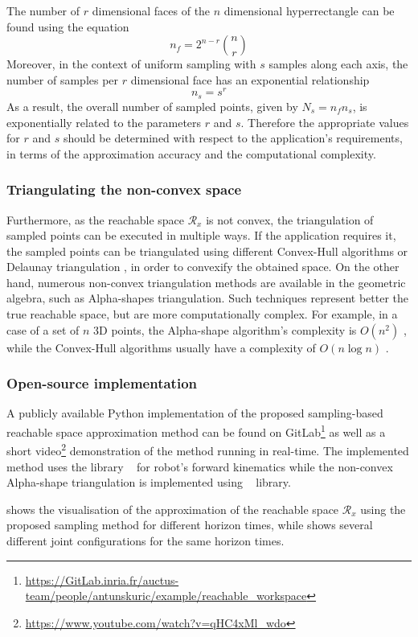 The number of $r$ dimensional faces of the $n$ dimensional hyperrectangle can be found using the equation
$$
n_f = 2^{n-r}\binom{n}{r}
$$
Moreover, in the context of uniform sampling with $s$ samples along each axis, the number of samples per $r$ dimensional face has an exponential relationship
$$
n_s = s^r
$$
As a result, the overall number of sampled points, given by $N_s = n_fn_s$, is exponentially related to the parameters $r$ and $s$. Therefore the appropriate values for $r$ and $s$ should be determined with respect to the application's requirements, in terms of the approximation accuracy and the computational complexity. 

\subsubsection*{Triangulating the non-convex space}
Furthermore, as the reachable space $\mathcal{R}_x$ is not convex, the triangulation of sampled points can be executed in multiple ways. If the application requires it, the sampled points can be triangulated using different Convex-Hull algorithms or Delaunay triangulation \cite{Lo1989Delaunay}, in order to convexify the obtained space. On the other hand, numerous non-convex triangulation methods are available in the geometric algebra, such as Alpha-shapes \cite{Edelsbrunner1994AlphaShape} triangulation. Such techniques represent better the true reachable space, but are more computationally complex. For example, in a case of a set of $n$ 3D points, the Alpha-shape algorithm's complexity is $O(n^2)$ \cite{Edelsbrunner1994AlphaShape}, while the Convex-Hull algorithms usually have a complexity of $O(n\log n)$ \cite{Barber1996}. 

\subsubsection*{Open-source implementation}
A publicly available Python implementation of the proposed sampling-based reachable space approximation method can be found on GitLab\footnote{\url{https://GitLab.inria.fr/auctus-team/people/antunskuric/example/reachable_workspace}} as well as a short video\footnote{\url{https://www.youtube.com/watch?v=qHC4xMl_wdo}} demonstration of the method running in real-time. The implemented method uses the library ~\cite{pinocchio2021} for robot's forward kinematics while the non-convex Alpha-shape triangulation is implemented using ~\cite{cgal3Dalpha} library.

 shows the visualisation of the approximation of the reachable space $\mathcal{R}_x$ using the proposed sampling method for different horizon times, while  shows several different joint configurations for the same horizon times.

